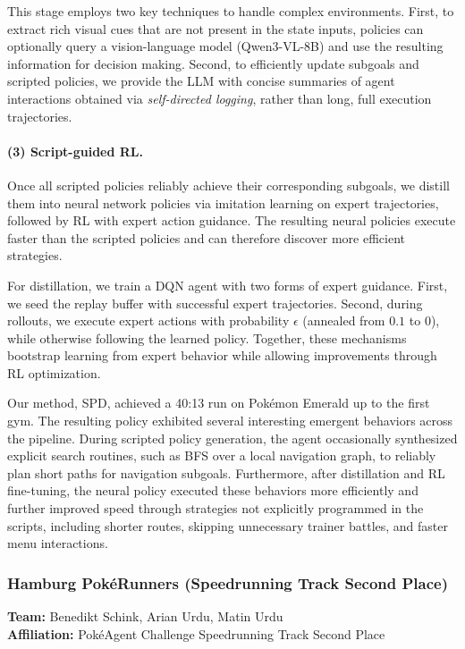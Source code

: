 This stage employs two key techniques to handle complex environments. First, to extract rich visual cues that are not present in the state inputs, policies can optionally query a vision-language model (Qwen3-VL-8B) and use the resulting information for decision making. Second, to efficiently update subgoals and scripted policies, we provide the LLM with concise summaries of agent interactions obtained via \textit{self-directed logging}, rather than long, full execution trajectories.

\paragraph{(3) Script-guided RL.} Once all scripted policies reliably achieve their corresponding subgoals, we distill them into neural network policies via imitation learning on expert trajectories, followed by RL with expert action guidance. The resulting neural policies execute faster than the scripted policies and can therefore discover more efficient strategies.

For distillation, we train a DQN agent with two forms of expert guidance. First, we seed the replay buffer with successful expert trajectories. Second, during rollouts, we execute expert actions with probability $\epsilon$ (annealed from $0.1$ to $0$), while otherwise following the learned policy. Together, these mechanisms bootstrap learning from expert behavior while allowing improvements through RL optimization.

Our method, SPD, achieved a 40:13 run on Pokémon Emerald up to the first gym. The resulting policy exhibited several interesting emergent behaviors across the pipeline. During scripted policy generation, the agent occasionally synthesized explicit search routines, such as BFS over a local navigation graph, to reliably plan short paths for navigation subgoals. Furthermore, after distillation and RL fine-tuning, the neural policy executed these behaviors more efficiently and further improved speed through strategies not explicitly programmed in the scripts, including shorter routes, skipping unnecessary trainer battles, and faster menu interactions.

\subsubsection{Hamburg Pok\'eRunners (Speedrunning Track Second Place)}
\label{sec:hamburg}

\textbf{Team:} Benedikt Schink, Arian Urdu, Matin Urdu \\
\textbf{Affiliation:} Pok\'eAgent Challenge Speedrunning Track Second Place

